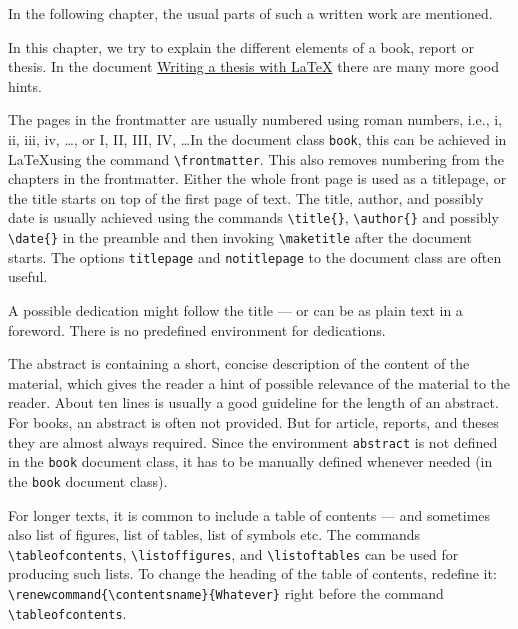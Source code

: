 In the following chapter, the usual parts of such a written work are mentioned. 


In this chapter, we try to explain the different elements of a book, report or thesis. In the document \hyperlink{https://tug.org/pracjourn/2008-1/mori/mori.pdf}{Writing a thesis with \LaTeX} there are many more good hints.

The pages in the frontmatter are usually numbered using roman numbers, i.e., i, ii, iii, iv, \ldots, or I, II, III, IV, \ldots In the document class \texttt{book}, this can be achieved in \LaTeX using the command 
\texttt{\textbackslash frontmatter}. This also removes numbering from the chapters in the frontmatter.
Either the whole front page is used as a titlepage, or the title starts on top of the first page of text. The title, author, and possibly date is usually achieved using the commands \texttt{\textbackslash title\{\}}, \texttt{\textbackslash author\{\}} and possibly \texttt{\textbackslash date\{\}} in the preamble and then invoking \texttt{\textbackslash maketitle} after the document starts. The options \texttt{titlepage} and \texttt{notitlepage} to the document class are often useful. 

A possible dedication might follow the title --- or can be as plain text in a foreword. 
There is no predefined environment for dedications.

The abstract is containing a short, concise description of the content of the material, which gives the reader a hint of possible relevance of the material to the reader. About ten lines is usually a good guideline for the length of an abstract. 
For books, an abstract is often not provided. 
But for article, reports, and theses they are almost always required. 
Since the environment \texttt{abstract} is not defined in the \texttt{book} document class, it has to be manually defined whenever needed (in the \texttt{book} document class). 

For longer texts, it is common to include a table of contents --- and sometimes also list of figures, list of tables, list of symbols etc. 
The commands \texttt{\textbackslash tableofcontents}, \texttt{\textbackslash listoffigures}, and \texttt{\textbackslash listoftables} can be used for producing such lists. To change the heading of the table of contents, redefine it: \texttt{\textbackslash renewcommand\{\textbackslash contentsname\}\{Whatever\}} right before the command 
\texttt{\textbackslash tableofcontents}.

